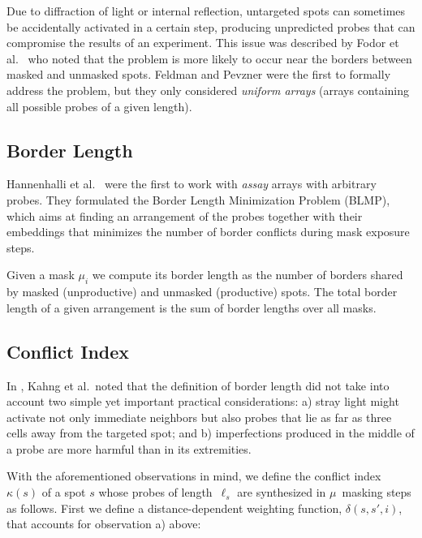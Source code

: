 \documentclass{article}
\begin{document}
Due to diffraction of light or internal reflection, untargeted spots can sometimes be accidentally activated in a certain step, producing unpredicted probes that can compromise the results of an experiment. This issue was described by Fodor et al.\ \cite{FODOR91} who noted that the problem is more likely to occur near the borders between masked and unmasked spots. Feldman and Pevzner \cite{FELDMAN93} were the first to formally address the problem, but they only considered \emph{uniform arrays} (arrays containing all possible probes of a given length). 

\subsection{Border Length}

Hannenhalli et al.\ \cite{HANNENHALLI02} were the first to work with \emph{assay} arrays with arbitrary probes. They formulated the Border Length Minimization Problem (BLMP), which aims at finding an arrangement of the probes together with their embeddings that minimizes the number of border conflicts during mask exposure steps.

Given a mask $\mu_{i}$ we compute its border length as the number of borders shared by masked (unproductive) and unmasked (productive) spots. The total border length of a given arrangement is the sum of border lengths over all masks.

\subsection{Conflict Index}

In \cite{KAHNG03}, Kahng et al.\ noted that the definition of border length did not take into account two simple yet important practical considerations: a) stray light might activate not only immediate neighbors but also probes that lie as far as three cells away from the targeted spot; and b) imperfections produced in the middle of a probe are more harmful than in its extremities.

With the aforementioned observations in mind, we define the conflict index $\kappa(s)$ of a spot $s$ whose probes of length~$\ell_{s}$ are synthesized in $\mu$~masking steps as follows. First we define a distance-dependent weighting function, $\delta(s,s',i)$, that accounts for observation a) above:
\end{document}
